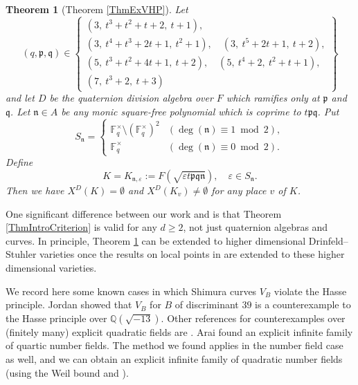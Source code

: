 \documentclass[10pt]{amsart}
\theoremstyle{plain}
\newtheorem{thm}{Theorem}[section]
\theoremstyle{definition}
\newcommand{\vep}{\varepsilon}
\newcommand{\bF}{\mathbb{F}}
\newcommand{\bQ}{\mathbb{Q}}
\newcommand{\frn}{\mathfrak{n}}
\newcommand{\frp}{\mathfrak{p}}
\newcommand{\frq}{\mathfrak{q}}
\begin{document}
\begin{thm}[Theorem \ref{ThmExVHP}]\label{ThmIntroHPV}
	Let
	\[
	(q,\frp,\frq)\in\left\{\begin{gathered}
		(3,\ t^3 + t^2 + t + 2,\ t+1),\\
		(3,\ t^4 + t^3 + 2t + 1,\ t^2 + 1),\quad (3,\ t^5 + 2t + 1,\ t+2),\\
		(5,\ t^3 + t^2 + 4 t + 1,\ t+2),\quad (5,\ t^4 + 2,\ t^2 + t + 1),\\(7,\ t^3+2,\ t+3)
	\end{gathered}\right\}
	\]
	and let $D$ be the quaternion division algebra over $F$ which ramifies only at $\frp$ and $\frq$.
	Let $\frn\in A$ be any monic square-free polynomial which is coprime to $t\frp\frq$. Put
	\[
	S_\frn=\left\{\begin{array}{ll}
		\bF_q^\times\setminus (\bF_q^\times)^2& (\deg(\frn)\equiv 1\bmod 2),\\
		\bF_q^\times &  (\deg(\frn)\equiv 0\bmod 2).
	\end{array}\right.
	\]
	Define
	\[
	K=K_{\frn,\vep}:=F(\sqrt{\vep t\frp\frq\frn}),\quad \vep\in S_\frn.
	\]
	Then we have $X^D(K)=\emptyset$ and $X^D(K_v)\neq\emptyset$ for any place $v$ of $K$. 
\end{thm}

One significant difference between our work and \cite{Jordan} is that Theorem \ref{ThmIntroCriterion} is valid for any $d\geq 2$, not just quaternion algebras
and curves. In principle, Theorem \ref{ThmIntroHPV} can be extended to higher dimensional Drinfeld--Stuhler varieties once the results on local points 
in \cite{Pap_loc} are
extended to these higher dimensional varieties. 

We record here some known cases in which Shimura curves $V_B$ violate the Hasse principle.   
Jordan showed that $V_B$ for $B$ of discriminant $39$ is a counterexample to the Hasse principle over $\bQ(\sqrt{-13})$. 
	Other references for counterexamples over (finitely many) explicit quadratic fields are \cite{Skoro,RdVP}.
Arai \cite[Proposition 2.6 (1)]{Arai} found an explicit infinite
family of quartic number fields. 
The method we found applies in the number field case as well, and we can obtain an explicit infinite family of quadratic number fields 
(using the Weil bound and \cite[Example 6.4]{Jordan}).
\end{document}
